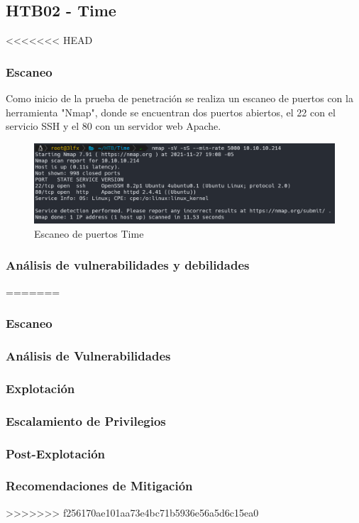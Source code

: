\subsection{HTB02 - Time}
<<<<<<< HEAD
    \subsubsection{Escaneo}
        \large{Como inicio de la prueba de penetración se realiza un escaneo de puertos con la herramienta "Nmap", donde se encuentran dos puertos abiertos, el 22 con el servicio SSH y el 80 con un servidor web Apache.}
        \par
        \begin{figure}[h!]
            \includegraphics[width=1\textwidth]{imagenes/nmap_time.png} \par \vspace{0.1cm}
            \caption{Escaneo de puertos Time} 
        \end{figure}
    \subsubsection{Análisis de vulnerabilidades y debilidades}
=======
\subsubsection{Escaneo}
\subsubsection{Análisis de Vulnerabilidades}
\subsubsection{Explotación}
\subsubsection{Escalamiento de Privilegios}
\subsubsection{Post-Explotación}
\subsubsection{Recomendaciones de Mitigación}
>>>>>>> f256170ae101aa73e4bc71b5936e56a5d6c15ea0
